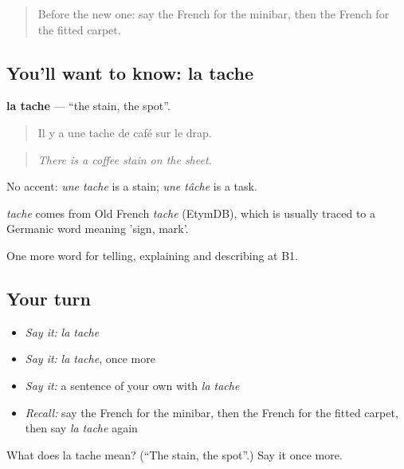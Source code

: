 \label{lesson:FR-C429-tache-stain}



\begin{quote}
Before the new one: say the French for the minibar, then the French for the fitted carpet.
\end{quote}

\subsection*{You'll want to know: la tache}
\textbf{la tache} — \textquotedblleft{}the stain, the spot\textquotedblright{}.

\begin{quote}
Il y a une tache de café sur le drap.
\end{quote}

\begin{quote}
\emph{There is a coffee stain on the sheet.}
\end{quote}

No accent: \emph{une tache} is a stain; \emph{une tâche} is a task.

\begin{cousinweb}
\emph{tache} comes from Old French \emph{tache} (EtymDB), which is usually traced to a Germanic word meaning 'sign, mark'.
\end{cousinweb}

\begin{grammarlens}[title={What you've built}]
One more word for telling, explaining and describing at B1.
\end{grammarlens}

\subsection*{Your turn}
\begin{itemize}
\raggedright
  \item \emph{Say it:} \emph{la tache}
  \item \emph{Say it:} \emph{la tache}, once more
  \item \emph{Say it:} a sentence of your own with \emph{la tache}
  \item \emph{Recall:} say the French for the minibar, then the French for the fitted carpet, then say \emph{la tache} again
\end{itemize}

\begin{tcolorbox}[breakable,colback=teal!4,colframe=teal!35!black,title={Before you move on}]
What does la tache mean? (\textquotedblleft{}The stain, the spot\textquotedblright{}.) Say it once more.
\end{tcolorbox}
